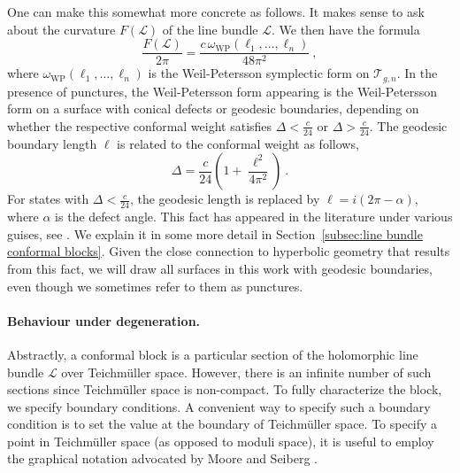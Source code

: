 \documentclass[12pt,a4paper]{article}
\newcommand{\be}{\begin{equation}}
\newcommand{\ee}{\end{equation}}
\begin{document}
One can make this somewhat more concrete as follows. It makes sense to ask about the curvature $F(\mathscr{L})$ of the line bundle $\mathscr{L}$. We then have the formula
\be 
\frac{F(\mathscr{L})}{2\pi}=\frac{c\, \omega_{\text{WP}}(\ell_1,\dots,\ell_n)}{48\pi^2}\ , \label{eq:line bundle conformal blocks curvature}
\ee
where $\omega_{\text{WP}}(\ell_1,\dots,\ell_n)$ is the Weil-Petersson symplectic form on $\mathcal{T}_{g,n}$. In the presence of punctures, the Weil-Petersson form appearing is the Weil-Petersson form on a surface with conical defects or geodesic boundaries, depending on whether the respective conformal weight satisfies $\Delta<\frac{c}{24}$ or $\Delta>\frac{c}{24}$. The geodesic boundary length $\ell$ is related to the conformal weight as follows,
\be 
\Delta=\frac{c}{24}\left(1+\frac{\ell^2}{4\pi^2} \right)\ . \label{eq:conformal weight geodesic length relation}
\ee
For states with $\Delta<\frac{c}{24}$, the geodesic length is replaced by $\ell=i (2\pi-\alpha)$, where $\alpha$ is the defect angle.
This fact has appeared in the literature under various guises, see \cite{Quillen, Friedan:1986ua, Zograf1, Zograf2, Verlinde:1989ua}. We explain it in some more detail in Section~\ref{subsec:line bundle conformal blocks}. Given the close connection to hyperbolic geometry that results from this fact, we will draw all surfaces in this work with geodesic boundaries, even though we sometimes refer to them as punctures.




\paragraph{Behaviour under degeneration.} Abstractly, a conformal block is a particular section of the holomorphic line bundle $\mathscr{L}$ over Teichm\"uller space. However, there is an infinite number of such sections since Teichm\"uller space is non-compact. 
To fully characterize the block, we specify boundary conditions. A convenient way to specify such a boundary condition is to set the value at the boundary of Teichm\"uller space.  To specify a point in Teichm\"uller space (as opposed to moduli space), it is useful to employ the graphical notation advocated by Moore and Seiberg \cite{Moore:1988qv}.
\end{document}
